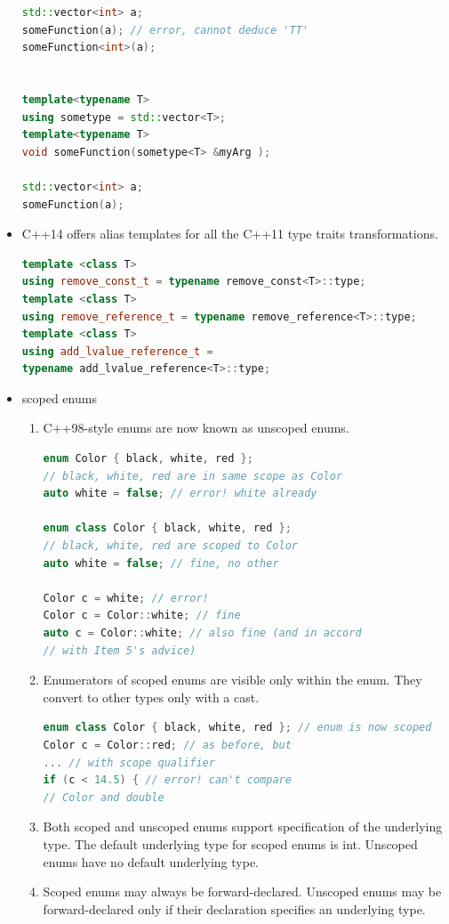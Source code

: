 \documentclass[a4paper,12pt,twoside]{book}
\begin{document}
\begin{itemize}
\begin{lstlisting}[frame=single, language=c++]
std::vector<int> a;
someFunction(a); // error, cannot deduce 'TT'
someFunction<int>(a);


template<typename T>
using sometype = std::vector<T>;
template<typename T>
void someFunction(sometype<T> &myArg );

std::vector<int> a;
someFunction(a);
\end{lstlisting}

\item C++14 offers alias templates for all the C++11 type traits transformations.
\begin{lstlisting}[frame=single, language=c++]
template <class T>
using remove_const_t = typename remove_const<T>::type;
template <class T>
using remove_reference_t = typename remove_reference<T>::type;
template <class T>
using add_lvalue_reference_t =
typename add_lvalue_reference<T>::type;
\end{lstlisting}


\item scoped enums
\begin{enumerate}
\item C++98-style enums are now known as unscoped enums.
\begin{lstlisting}[frame=single, language=c++]
enum Color { black, white, red };
// black, white, red are in same scope as Color
auto white = false; // error! white already

enum class Color { black, white, red };
// black, white, red are scoped to Color
auto white = false; // fine, no other

Color c = white; // error!
Color c = Color::white; // fine
auto c = Color::white; // also fine (and in accord
// with Item 5's advice)
\end{lstlisting}

\item Enumerators of scoped enums are visible only within the enum. They convert
to other types only with a cast.
\begin{lstlisting}[frame=single, language=c++]
enum class Color { black, white, red }; // enum is now scoped
Color c = Color::red; // as before, but
... // with scope qualifier
if (c < 14.5) { // error! can't compare
// Color and double
\end{lstlisting}
\item Both scoped and unscoped enums support specification of the underlying type.
The default underlying type for scoped enums is int. Unscoped enums have no
default underlying type.

\item Scoped enums may always be forward-declared. Unscoped enums may be
forward-declared only if their declaration specifies an underlying type.
\end{enumerate}


\end{itemize}
\end{document}
